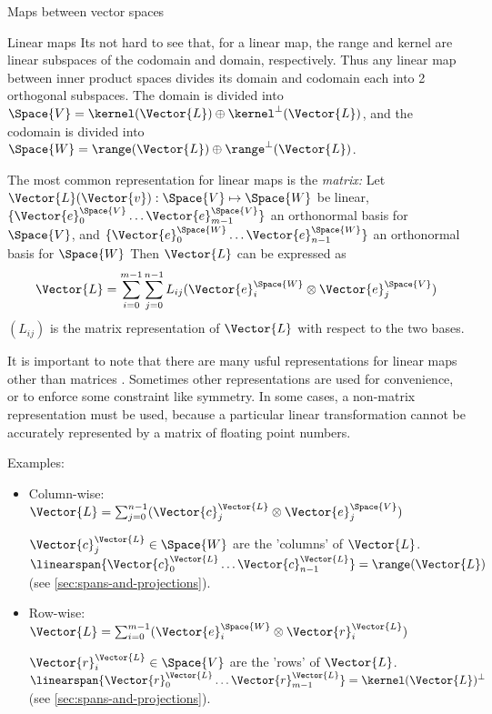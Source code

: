 \begin{plSection}{Maps between vector spaces}
\begin{plSection}{Linear maps}
Its not hard to see that, for a linear map,
the range and kernel are linear subspaces of the codomain and
domain, respectively.
Thus any linear map between inner product spaces
divides its domain and codomain each into 2 orthogonal subspaces.
The domain is divided into $\Space{V} = \kernel(\Vector{L}) \oplus \kernel^{\perp}(\Vector{L})$,
and the codomain is divided into $\Space{W} = \range(\Vector{L}) \oplus \range^{\perp}(\Vector{L})$.

The most common representation for linear maps is the {\it matrix:}
Let $\Vector{L}(\Vector{v}):\Space{V} \mapsto \Space{W}$ be linear,
$\{ \Vector{e}_0^{\Space{V}} \ldots  \Vector{e}_{m-1}^{\Space{V}} \}$ an orthonormal basis for $\Space{V}$,
and
$\{ \Vector{e}_0^{\Space{W}} \ldots \Vector{e}_{n-1}^{\Space{W}} \}$ an orthonormal  basis for $\Space{W}$
Then $\Vector{L}$ can be expressed as
\begin{equation}
\Vector{L}
 =
\sum_{i=0}^{m-1} \sum_{j=0}^{n-1} L_{ij} ( \Vector{e}_i^{\Space{W}} \otimes \Vector{e}_j^{\Space{V}} )
\end{equation}
$(L_{ij})$ is the matrix representation of $\Vector{L}$ with respect to
the two bases\cite{Halmos:1958:Finite}.

It is important to note that there are many usful
representations for linear maps other than matrices \cite{McDonald:1989:OOPSLA}.
Sometimes other representations are used for convenience,
or to enforce some constraint like symmetry.
In some cases, a non-matrix representation must be used,
because a particular linear transformation
cannot be accurately represented by a matrix of floating point numbers.

Examples:

\begin{itemize}

\item Column-wise:
$\Vector{L} = 
\sum_{j=0}^{n-1} ( \Vector{c}_j^{\Vector{L}} 
\otimes \Vector{e}_j^{\Space{V}} )$

$\Vector{c}_j^{\Vector{L}} \in \Space{W}$ 
are the 'columns' of $\Vector{L}$.
$\linearspan\{ \Vector{c}_0^{\Vector{L}} 
\ldots \Vector{c}_{n-1}^{\Vector{L}} \} 
= \range(\Vector{L})$
(see \cref{sec:spans-and-projections}).

\item Row-wise:
$\Vector{L} = \sum_{i=0}^{m-1} ( \Vector{e}_i^{\Space{W}} \otimes  \Vector{r}_i^{\Vector{L}} )$

$\Vector{r}_i^{\Vector{L}} \in \Space{V}$ are the 'rows' of $\Vector{L}$.
$\linearspan\{ \Vector{r}_0^{\Vector{L}} \ldots \Vector{r}_{m-1}^{\Vector{L}} \} =  \kernel(\Vector{L})^{\perp}$
(see \autoref{sec:spans-and-projections}).


\end{itemize}
\end{plSection}
\end{plSection}
